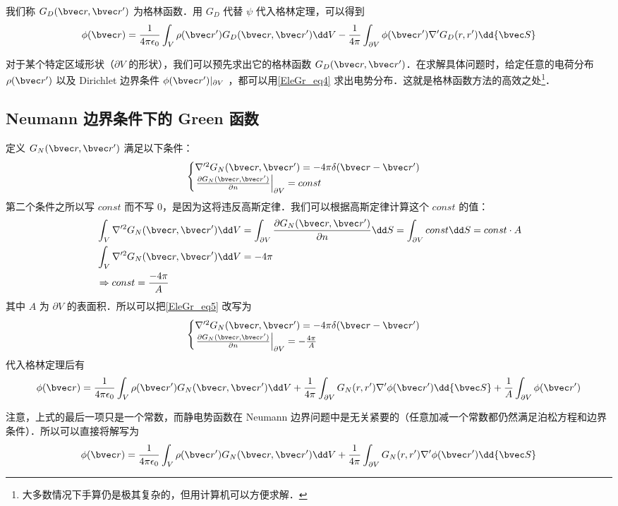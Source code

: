 我们称 $G_D(\bvec r,\bvec r')$ 为格林函数．用 $G_D$ 代替 $\psi$ 代入格林定理，可以得到
\begin{equation}\label{EleGr_eq4}
\phi(\bvec r)=\frac{1}{4\pi\epsilon_0}\int_V \rho(\bvec r')G_D(\bvec r,\bvec r')\dd V-\frac{1}{4\pi}\int_{\partial V} \phi(\bvec r')\nabla'G_D(r,r')\dd {\bvec S}
\end{equation}

对于某个特定区域形状（$\partial V$ 的形状），我们可以预先求出它的格林函数 $G_D(\bvec r,\bvec r')$．在求解具体问题时，给定任意的电荷分布 $\rho(\bvec r')$ 以及 Dirichlet 边界条件 $\phi(\bvec r')|_{\partial V}$ ，都可以用\autoref{EleGr_eq4} 求出电势分布．这就是格林函数方法的高效之处\footnote{大多数情况下手算仍是极其复杂的，但用计算机可以方便求解．}．

\subsection{Neumann 边界条件下的 Green 函数}
定义 $G_N(\bvec r,\bvec r')$ 满足以下条件：
\begin{equation}\label{EleGr_eq5}
\begin{cases}
\nabla'^2G_N(\bvec r,\bvec r')=-4\pi\delta(\bvec r-\bvec r')\\
\left.\frac{\partial G_N(\bvec r,\bvec r')}{\partial n}\right|_{\partial V}=const
\end{cases}
\end{equation}
第二个条件之所以写 $const$ 而不写 $0$，是因为这将违反高斯定律．我们可以根据高斯定律计算这个 $const$ 的值：
\begin{equation}
\begin{aligned}
&\int_V \nabla'^2 G_N(\bvec r,\bvec r')\dd V=\int_{\partial V}\frac{\partial G_N(\bvec r,\bvec r')}{\partial n}\dd S=\int_{\partial V}const \dd S=const\cdot A\\
&\int_V \nabla'^2 G_N(\bvec r,\bvec r')\dd V=-4\pi\\
&\Rightarrow const=\frac{-4\pi}{A}
\end{aligned}
\end{equation}
其中 $A$ 为 $\partial V$ 的表面积．所以可以把\autoref{EleGr_eq5} 改写为
\begin{equation}
\begin{cases}
\nabla'^2G_N(\bvec r,\bvec r')=-4\pi\delta(\bvec r-\bvec r')\\
\left.\frac{\partial G_N(\bvec r,\bvec r')}{\partial n}\right|_{\partial V}=-\frac{4\pi}{A}
\end{cases}
\end{equation}
代入格林定理后有
\begin{equation}
\phi(\bvec r)=\frac{1}{4\pi\epsilon_0}\int_V \rho(\bvec r')G_N(\bvec r,\bvec r')\dd V+\frac{1}{4\pi}\int_{\partial V} G_N(r,r')\nabla'\phi(\bvec r')\dd {\bvec S}+\frac{1}{A}\int_{\partial V}\phi(\bvec r')
\end{equation}

注意，上式的最后一项只是一个常数，而静电势函数在 Neumann 边界问题中是无关紧要的（任意加减一个常数都仍然满足泊松方程和边界条件）．所以可以直接将解写为
\begin{equation}
\phi(\bvec r)=\frac{1}{4\pi\epsilon_0}\int_V \rho(\bvec r')G_N(\bvec r,\bvec r')\dd V+\frac{1}{4\pi}\int_{\partial V} G_N(r,r')\nabla'\phi(\bvec r')\dd {\bvec S}
\end{equation}
